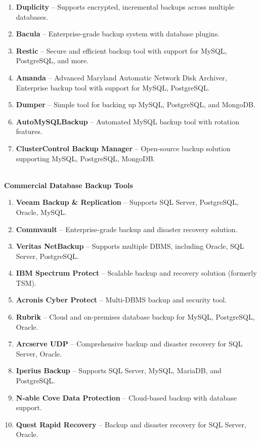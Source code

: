 \documentclass[12pt]{article}
\begin{document}
\begin{enumerate}
    \item \textbf{Duplicity} -- Supports encrypted, incremental backups across multiple databases.
    \item \textbf{Bacula} -- Enterprise-grade backup system with database plugins.
    \item \textbf{Restic} -- Secure and efficient backup tool with support for MySQL, PostgreSQL, and more.
    \item \textbf{Amanda} -- Advanced Maryland Automatic Network Disk Archiver, Enterprise backup tool with support for MySQL, PostgreSQL.
    \item \textbf{Dumper} -- Simple tool for backing up MySQL, PostgreSQL, and MongoDB.
    \item \textbf{AutoMySQLBackup} -- Automated MySQL backup tool with rotation features.
    \item \textbf{ClusterControl Backup Manager} -- Open-source backup solution supporting MySQL, PostgreSQL, MongoDB.
\end{enumerate}

\textbf{\\Commercial Database Backup Tools}

\begin{enumerate}
    \item \textbf{Veeam Backup \& Replication} -- Supports SQL Server, PostgreSQL, Oracle, MySQL.
    \item \textbf{Commvault} -- Enterprise-grade backup and disaster recovery solution.
    \item \textbf{Veritas NetBackup} -- Supports multiple DBMS, including Oracle, SQL Server, PostgreSQL.
    \item \textbf{IBM Spectrum Protect} -- Scalable backup and recovery solution (formerly TSM).
    \item \textbf{Acronis Cyber Protect} -- Multi-DBMS backup and security tool.
    \item \textbf{Rubrik} -- Cloud and on-premises database backup for MySQL, PostgreSQL, Oracle.
    \item \textbf{Arcserve UDP} -- Comprehensive backup and disaster recovery for SQL Server, Oracle.
    \item \textbf{Iperius Backup} -- Supports SQL Server, MySQL, MariaDB, and PostgreSQL.
    \item \textbf{N-able Cove Data Protection} -- Cloud-based backup with database support.
    \item \textbf{Quest Rapid Recovery} -- Backup and disaster recovery for SQL Server, Oracle.
\end{enumerate}
\end{document}
